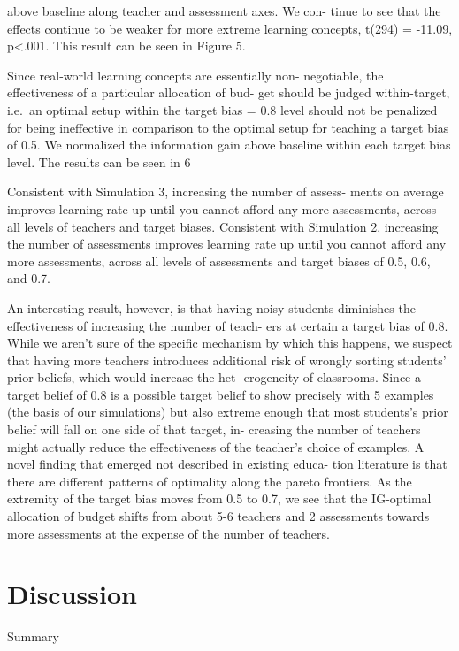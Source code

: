 \documentclass[man]{apa6}
\begin{document}
above baseline along teacher and assessment axes. We con- tinue to see
that the effects continue to be weaker for more extreme learning
concepts, t(294) = -11.09, p\textless{}.001. This result can be seen in
Figure 5.

Since real-world learning concepts are essentially non- negotiable, the
effectiveness of a particular allocation of bud- get should be judged
within-target, i.e.~an optimal setup within the target bias = 0.8 level
should not be penalized for being ineffective in comparison to the
optimal setup for teaching a target bias of 0.5. We normalized the
information gain above baseline within each target bias level. The
results can be seen in 6

Consistent with Simulation 3, increasing the number of assess- ments on
average improves learning rate up until you cannot afford any more
assessments, across all levels of teachers and target biases. Consistent
with Simulation 2, increasing the number of assessments improves
learning rate up until you cannot afford any more assessments, across
all levels of assessments and target biases of 0.5, 0.6, and 0.7.

An interesting result, however, is that having noisy students diminishes
the effectiveness of increasing the number of teach- ers at certain a
target bias of 0.8. While we aren't sure of the specific mechanism by
which this happens, we suspect that having more teachers introduces
additional risk of wrongly sorting students' prior beliefs, which would
increase the het- erogeneity of classrooms. Since a target belief of 0.8
is a possible target belief to show precisely with 5 examples (the basis
of our simulations) but also extreme enough that most students's prior
belief will fall on one side of that target, in- creasing the number of
teachers might actually reduce the effectiveness of the teacher's choice
of examples. A novel finding that emerged not described in existing
educa- tion literature is that there are different patterns of
optimality along the pareto frontiers. As the extremity of the target
bias moves from 0.5 to 0.7, we see that the IG-optimal allocation of
budget shifts from about 5-6 teachers and 2 assessments towards more
assessments at the expense of the number of teachers.

\section{Discussion}\label{discussion}

Summary
\end{document}
